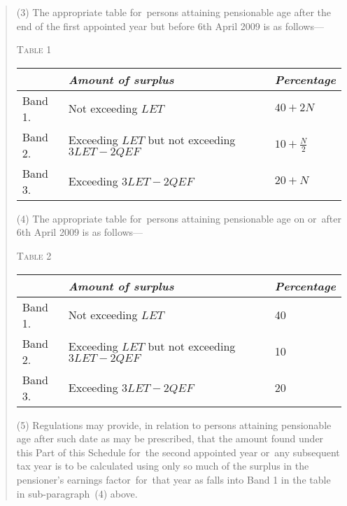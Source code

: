 \documentclass[12pt,a4paper]{article}
\begin{document}
\begin{quotation}
(3) The appropriate table for~persons attaining pensionable age after the end of the first appointed year but before 6th April 2009 is as follows—

\medskip

\noindent\textsc{Table 1}

{\noindent\footnotesize
\begin{longtable}{lll}
\hline
&\itshape Amount of surplus	&\itshape Percentage\\
\hline
\endhead
\hline
\endlastfoot
Band 1. 	&Not exceeding $LET$	&$40 + 2N$\\
Band 2. 	&Exceeding $LET$ but not exceeding $3LET - 2QEF$	&$10 + \frac{N}{2}$\\
Band 3. 	&Exceeding $3LET - 2QEF$	&$20 + N$\\
\end{longtable}

}

\medskip

(4) The appropriate table for~persons attaining pensionable age on or~after 6th April 2009 is as follows—

\medskip

\noindent\textsc{Table 2}

{\noindent\footnotesize
\begin{longtable}{lll}
\hline
&\itshape Amount of surplus	&\itshape Percentage\\
\hline
\endhead
\hline
\endlastfoot
Band 1. 	&Not exceeding $LET$	&40\\
Band 2. 	&Exceeding $LET$ but not exceeding $3LET - 2QEF$	&10\\
Band 3. 	&Exceeding $3LET - 2QEF$	&20\\
\end{longtable}

}

(5) Regulations may provide, in relation to persons attaining pensionable age after such date as may be prescribed, that the amount found under this Part of this Schedule for~the second appointed year or~any subsequent tax year is to be calculated using only so much of the surplus in the pensioner’s earnings factor~for~that year as falls into Band 1 in the table in sub-paragraph~(4)  above.


\end{quotation}
\end{document}
